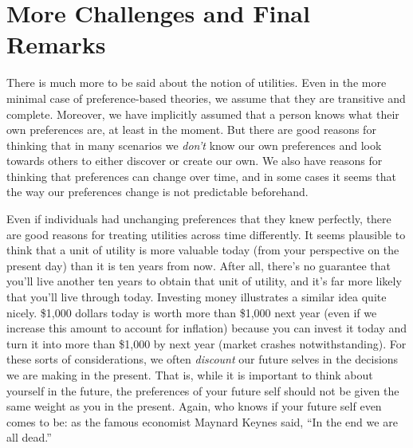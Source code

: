 \documentclass[]{tufte-book}
\begin{document}
\hypertarget{more-challenges-and-final-remarks}{%
\section{More Challenges and Final Remarks}\label{more-challenges-and-final-remarks}}

There is much more to be said about the notion of utilities. Even in the more minimal case of preference-based theories, we assume that they are transitive and complete. Moreover, we have implicitly assumed that a person knows what their own preferences are, at least in the moment. But there are good reasons for thinking that in many scenarios we \emph{don't} know our own preferences and look towards others to either discover or create our own. We also have reasons for thinking that preferences can change over time, and in some cases it seems that the way our preferences change is not predictable beforehand.

Even if individuals had unchanging preferences that they knew perfectly, there are good reasons for treating utilities across time differently. It seems plausible to think that a unit of utility is more valuable today (from your perspective on the present day) than it is ten years from now. After all, there's no guarantee that you'll live another ten years to obtain that unit of utility, and it's far more likely that you'll live through today. Investing money illustrates a similar idea quite nicely. \$1,000 dollars today is worth more than \$1,000 next year (even if we increase this amount to account for inflation) because you can invest it today and turn it into more than \$1,000 by next year (market crashes notwithstanding). For these sorts of considerations, we often \emph{discount} our future selves in the decisions we are making in the present. That is, while it is important to think about yourself in the future, the preferences of your future self should not be given the same weight as you in the present. Again, who knows if your future self even comes to be: as the famous economist Maynard Keynes said, ``In the end we are all dead.''
\end{document}
